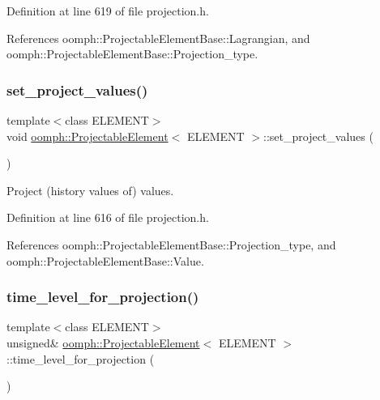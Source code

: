 Definition at line 619 of file projection.\+h.



References oomph\+::\+Projectable\+Element\+Base\+::\+Lagrangian, and oomph\+::\+Projectable\+Element\+Base\+::\+Projection\+\_\+type.

\mbox{\label{classoomph_1_1ProjectableElement_a51fefa06ef9dc90ea400a0fa1711c232}} 
\subsubsection{\texorpdfstring{set\+\_\+project\+\_\+values()}{set\_project\_values()}}
{\footnotesize\ttfamily template$<$class E\+L\+E\+M\+E\+NT$>$ \\
void \hyperlink{classoomph_1_1ProjectableElement}{oomph\+::\+Projectable\+Element}$<$ E\+L\+E\+M\+E\+NT $>$\+::set\+\_\+project\+\_\+values (\begin{DoxyParamCaption}{ }\end{DoxyParamCaption})\hspace{0.3cm}{\ttfamily [inline]}}



Project (history values of) values. 



Definition at line 616 of file projection.\+h.



References oomph\+::\+Projectable\+Element\+Base\+::\+Projection\+\_\+type, and oomph\+::\+Projectable\+Element\+Base\+::\+Value.

\mbox{\label{classoomph_1_1ProjectableElement_adabcd890a2193f3369dd8e1272f27f5b}} 
\subsubsection{\texorpdfstring{time\+\_\+level\+\_\+for\+\_\+projection()}{time\_level\_for\_projection()}}
{\footnotesize\ttfamily template$<$class E\+L\+E\+M\+E\+NT$>$ \\
unsigned\& \hyperlink{classoomph_1_1ProjectableElement}{oomph\+::\+Projectable\+Element}$<$ E\+L\+E\+M\+E\+NT $>$\+::time\+\_\+level\+\_\+for\+\_\+projection (\begin{DoxyParamCaption}{ }\end{DoxyParamCaption})\hspace{0.3cm}{\ttfamily [inline]}}



